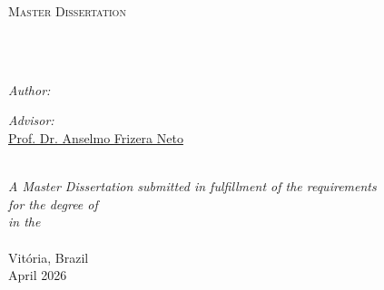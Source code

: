 \documentclass[
12pt, %
oneside, %
english, %
onehalfspacing,%
liststotoc, %
parskip, %
headsepline, %
]{MastersDoctoralThesis} %
\begin{document}
\begin{titlepage}
\begin{center}

\vspace*{.06\textheight}
{\scshape\LARGE \univname\par}\vspace{0.8cm} %
\textsc{\Large Master Dissertation}\\[0.4cm] %

\HRule \\[0.2cm] %
{\huge \bfseries \ttitle\par}\vspace{0.4cm} %
\HRule \\[0.5cm] %
 
\begin{minipage}[t]{0.4\textwidth}
\begin{flushleft} \normalsize
\emph{Author:}\\
\href{http://lattes.cnpq.br/4989902091912735}{\authorname} %
\end{flushleft}
\end{minipage}
\begin{minipage}[t]{0.4\textwidth}
\begin{flushright} \normalsize
\emph{Advisor:} \\
\href{http://lattes.cnpq.br/8928890008799265}{Prof. Dr. Anselmo Frizera Neto} \\
\end{flushright}
\end{minipage}
\\[0.8 cm]


\normalsize \textit{A Master Dissertation submitted in fulfillment of the requirements\\ for the degree of \degreename}\\[0.15cm] %
\textit{in the}\\[0.2cm]
\deptname\\[1cm] %
 

Vit\'{o}ria, Brazil\\
April 2026
 
\end{center}
\end{titlepage}
\end{document}
